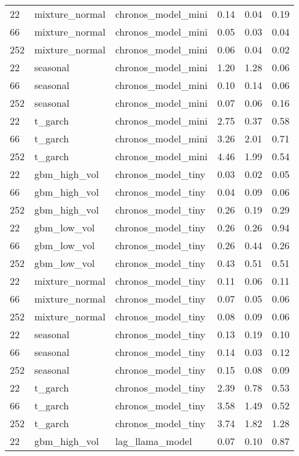 {\begin{tabular}{lllrrr}
\midrule
22 & mixture\_normal & chronos\_model\_mini & 0.14 & 0.04 & 0.19 \\
66 & mixture\_normal & chronos\_model\_mini & 0.05 & 0.03 & 0.04 \\
252 & mixture\_normal & chronos\_model\_mini & 0.06 & 0.04 & 0.02 \\
\midrule
22 & seasonal & chronos\_model\_mini & 1.20 & 1.28 & 0.06 \\
66 & seasonal & chronos\_model\_mini & 0.10 & 0.14 & 0.06 \\
252 & seasonal & chronos\_model\_mini & 0.07 & 0.06 & 0.16 \\
\midrule
22 & t\_garch & chronos\_model\_mini & 2.75 & 0.37 & 0.58 \\
66 & t\_garch & chronos\_model\_mini & 3.26 & 2.01 & 0.71 \\
252 & t\_garch & chronos\_model\_mini & 4.46 & 1.99 & 0.54 \\
\midrule
22 & gbm\_high\_vol & chronos\_model\_tiny & 0.03 & 0.02 & 0.05 \\
66 & gbm\_high\_vol & chronos\_model\_tiny & 0.04 & 0.09 & 0.06 \\
252 & gbm\_high\_vol & chronos\_model\_tiny & 0.26 & 0.19 & 0.29 \\
\midrule
22 & gbm\_low\_vol & chronos\_model\_tiny & 0.26 & 0.26 & 0.94 \\
66 & gbm\_low\_vol & chronos\_model\_tiny & 0.26 & 0.44 & 0.26 \\
252 & gbm\_low\_vol & chronos\_model\_tiny & 0.43 & 0.51 & 0.51 \\
\midrule
22 & mixture\_normal & chronos\_model\_tiny & 0.11 & 0.06 & 0.11 \\
66 & mixture\_normal & chronos\_model\_tiny & 0.07 & 0.05 & 0.06 \\
252 & mixture\_normal & chronos\_model\_tiny & 0.08 & 0.09 & 0.06 \\
\midrule
22 & seasonal & chronos\_model\_tiny & 0.13 & 0.19 & 0.10 \\
66 & seasonal & chronos\_model\_tiny & 0.14 & 0.03 & 0.12 \\
252 & seasonal & chronos\_model\_tiny & 0.15 & 0.08 & 0.09 \\
\midrule
22 & t\_garch & chronos\_model\_tiny & 2.39 & 0.78 & 0.53 \\
66 & t\_garch & chronos\_model\_tiny & 3.58 & 1.49 & 0.52 \\
252 & t\_garch & chronos\_model\_tiny & 3.74 & 1.82 & 1.28 \\
\midrule
22 & gbm\_high\_vol & lag\_llama\_model & 0.07 & 0.10 & 0.87 \\

\end{tabular}}
